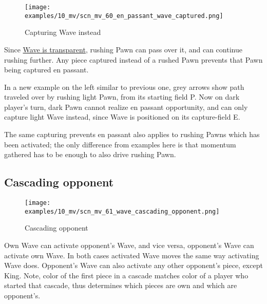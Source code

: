 
\vspace*{1.7\baselineskip}
\noindent
\begin{wrapfigure}[13]{l}{0.4\textwidth}
\centering
\texttt{[image: examples/10\_mv/scn\_mv\_60\_en\_passant\_wave\_captured.png]}
\vspace*{-1.4\baselineskip}
\caption{Capturing Wave instead}
\label{fig:scn_mv_60_en_passant_wave_captured}
\end{wrapfigure}
Since \hyperref[fig:scn_mv_07_wave_is_transparent]{Wave is transparent}, rushing
Pawn can pass over it, and can continue rushing further. Any piece captured instead
of a rushed Pawn prevents that Pawn being captured en passant.

In a new example on the left similar to previous one, grey arrows show path traveled
over by rushing light Pawn, from its starting field P. Now on dark player's turn,
dark Pawn cannot realize en passant opportunity, and can only capture light Wave
instead, since Wave is positioned on its capture-field E.

The same capturing prevents en passant also applies to rushing Pawns which has
been activated; the only difference from examples here is that momentum gathered
has to be enough to also drive rushing Pawn.

\clearpage %

\subsection*{Cascading opponent}
\label{sec:Miranda's veil/Wave/Cascading opponent}

\vspace*{-1.4\baselineskip}
\noindent
\begin{figure}[h]
\texttt{[image: examples/10\_mv/scn\_mv\_61\_wave\_cascading\_opponent.png]}
\caption{Cascading opponent}
\label{fig:scn_mv_61_wave_cascading_opponent}
\end{figure}

Own Wave can activate opponent's Wave, and vice versa, opponent's Wave can activate
own Wave. In both cases activated Wave moves the same way activating Wave does.
Opponent's Wave can also activate any other opponent's piece, except King. Note,
color of the first piece in a cascade matches color of a player who started that
cascade, thus determines which pieces are own and which are opponent's.

